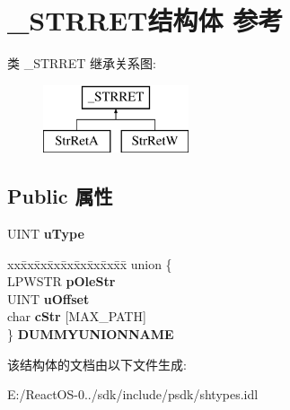 \hypertarget{struct___s_t_r_r_e_t}{}\section{\+\_\+\+S\+T\+R\+R\+E\+T结构体 参考}
\label{struct___s_t_r_r_e_t}
类 \+\_\+\+S\+T\+R\+R\+ET 继承关系图\+:\begin{figure}[H]
\begin{center}
\leavevmode
\includegraphics[height=2.000000cm]{struct___s_t_r_r_e_t}
\end{center}
\end{figure}
\subsection*{Public 属性}
\begin{DoxyCompactItemize}
\item 
\mbox{\label{struct___s_t_r_r_e_t_a174dec7ee79f84d4082df2e09941913d}} 
U\+I\+NT {\bfseries u\+Type}
\item 
\mbox{\label{struct___s_t_r_r_e_t_a934199857d738471aecff47e3e7efba8}} 
\begin{tabbing}
xx\=xx\=xx\=xx\=xx\=xx\=xx\=xx\=xx\=\kill
union \{\\
\>LPWSTR {\bfseries pOleStr}\\
\>UINT {\bfseries uOffset}\\
\>char {\bfseries cStr} \mbox{[}MAX\_PATH\mbox{]}\\
\} {\bfseries DUMMYUNIONNAME}\\

\end{tabbing}\end{DoxyCompactItemize}


该结构体的文档由以下文件生成\+:\begin{DoxyCompactItemize}
\item 
E\+:/\+React\+O\+S-\/0../sdk/include/psdk/shtypes.\+idl\end{DoxyCompactItemize}
